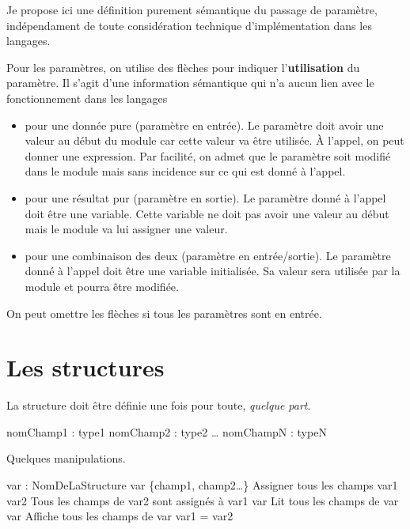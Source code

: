	\begin{Note}
	Je propose ici une définition purement sémantique
	du passage de paramètre, indépendament de toute considération
	technique d'implémentation dans les langages.
	\end{Note}

	Pour les paramètres, on utilise des flèches pour indiquer l'\textbf{utilisation} du paramètre.
	Il s'agit d'une information sémantique qui n'a aucun lien avec le fonctionnement dans les langages
		
	\begin{itemize}
	\item \In{}
		pour une donnée pure (paramètre en entrée).
		Le paramètre doit avoir une valeur au début du module
		car cette valeur va être utilisée.
		À l'appel, on peut donner une expression.
		Par facilité,
		on admet que le paramètre soit modifié dans le module
		mais sans incidence sur ce qui est donné à l'appel.
	\item \Out{}
		pour une résultat pur (paramètre en sortie).
		Le paramètre donné à l'appel doit être une variable.
		Cette variable ne doit pas avoir une valeur au début
		mais le module va lui assigner une valeur.
	\item \InOut{}
		pour une combinaison des deux (paramètre en entrée/sortie).
		Le paramètre donné à l'appel doit être une variable initialisée.
		Sa valeur sera utilisée par la module et pourra être modifiée.
	\end{itemize}

	On peut omettre les flèches si tous les paramètres sont en entrée.
	
\section{Les structures}

	La structure doit être définie une fois pour toute, 
	\emph{quelque part}.
	
	\begin{Pseudocode}
		\Decl nomChamp1 : type1
		\Decl nomChamp2 : type2
		\Decl \dots
		\Decl nomChampN : typeN
	\EndStruct
	\end{Pseudocode}

	Quelques manipulations.
	
	\begin{Pseudocode}
	\Decl var : NomDeLaStructure
	\Let var \Gets \{champ1, champ2\dots\} \RComment Assigner tous les champs
	\Let var1 \Gets var2 \RComment Tous les champs de var2 sont assignés à var1
	\Read var \RComment Lit tous les champs de var
	\Write var \RComment Affiche tous les champs de var 
	\Stmt var1 = var2 \RComment {Teste l'égalité de tous les champs}
	\end{Pseudocode}

